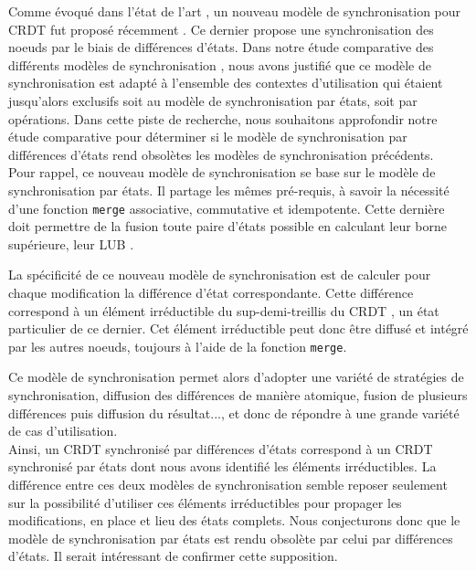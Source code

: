 \label{sec:perspective-comparison-sync-models}
Comme évoqué dans l'état de l'art , un nouveau modèle de synchronisation pour \ac{CRDT} fut proposé récemment \cite{almeida2015delta}.
Ce dernier propose une synchronisation des noeuds par le biais de différences d'états.
Dans notre étude comparative des différents modèles de synchronisation , nous avons justifié que ce modèle de synchronisation est adapté à l'ensemble des contextes d'utilisation qui étaient jusqu'alors exclusifs soit au modèle de synchronisation par états, soit par opérations.
Dans cette piste de recherche, nous souhaitons approfondir notre étude comparative pour déterminer si le modèle de synchronisation par différences d'états rend obsolètes les modèles de synchronisation précédents. \\

Pour rappel, ce nouveau modèle de synchronisation se base sur le modèle de synchronisation par états.
Il partage les mêmes pré-requis, à savoir la nécessité d'une fonction \texttt{merge} associative, commutative et idempotente.
Cette dernière doit permettre de la fusion toute paire d'états possible en calculant leur borne supérieure, \ie leur \ac{LUB} \cite{2018-crdts-perguica-baquero-shapiro}.

La spécificité de ce nouveau modèle de synchronisation est de calculer pour chaque modification la différence d'état correspondante.
Cette différence correspond à un élément irréductible du sup-demi-treillis du \ac{CRDT} \cite{enes2019}, \ie un état particulier de ce dernier.
Cet élément irréductible peut donc être diffusé et intégré par les autres noeuds, toujours à l'aide de la fonction \texttt{merge}.

Ce modèle de synchronisation permet alors d'adopter une variété de stratégies de synchronisation, \eg diffusion des différences de manière atomique, fusion de plusieurs différences puis diffusion du résultat..., et donc de répondre à une grande variété de cas d'utilisation.\\

Ainsi, un \ac{CRDT} synchronisé par différences d'états correspond à un \ac{CRDT} synchronisé par états dont nous avons identifié les éléments irréductibles.
La différence entre ces deux modèles de synchronisation semble reposer seulement sur la possibilité d'utiliser ces éléments irréductibles pour propager les modifications, en place et lieu des états complets.
Nous conjecturons donc que le modèle de synchronisation par états est rendu obsolète par celui par différences d'états.
Il serait intéressant de confirmer cette supposition.\\

